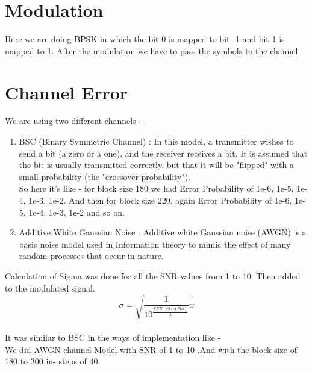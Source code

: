 \documentclass[12pt,a4paper,onecolumn]{article}
\begin{document}
\section{Modulation}
Here we are doing BPSK in which the bit 0 is mapped to bit -1 and bit 1 is mapped to 1. 
After the modulation we have to pass the symbols to the channel 
\section{Channel Error}
We are using two different channels - %
\begin{enumerate}
\item BSC (Binary Symmetric Channel) : In this model, a transmitter wishes to send a bit (a zero or a one), and the receiver receives a bit. It is assumed that the bit is usually transmitted correctly, but that it will be "flipped" with a small probability (the "crossover probability"). \\
So here it’s like - for block size 180 we had Error Probability of 1e-6, 1e-5, 1e-4, 1e-3, 1e-2. And then for block size 220, again Error Probability of 1e-6, 1e-5, 1e-4, 1e-3, 1e-2 and so on. 
\item
Additive White Gaussian Noise : Additive white Gaussian noise (AWGN) is a basic noise model used in Information theory to mimic the effect of many random processes that occur in nature. 
\\
\end{enumerate}
Calculation of Sigma was done for all the SNR values from 1 to 10. Then added to the modulated signal.\\
\begin{equation*}
\sigma = \sqrt{\frac{1}{10^\frac{SNR(ErrorPro)}{10}}}x
\end{equation*}
\\
It was similar to BSC in the ways of implementation like - \\
We did AWGN channel Model  with SNR of 1 to 10 .And with the block size of 180 to 300 in- steps of 40.
\end{document}
